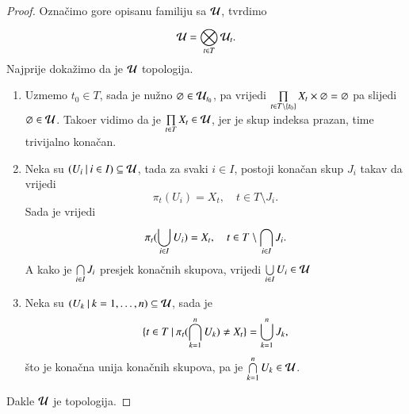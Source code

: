\begin{proof}
    Ozna\v cimo gore opisanu familiju sa $\mathcal{U}$, tvrdimo
    \begin{equation*}
        \mathcal{U} = \bigotimes\limits_{t \in T}^{} \mathcal{U}_t.
    \end{equation*}
    Najprije doka\v zimo da je $\mathcal{U}$ topologija.
    \begin{enumerate}[label=(\roman*)]
        \item Uzmemo $t_0 \in T$, sada je nu\v zno $\varnothing \in \mathcal{U}_{t_0}$, pa vrijedi $\prod\limits_{t \in T \setminus \{t_0\}}^{} X_t \times \varnothing = \varnothing$ pa slijedi $\varnothing \in \mathcal{U}$.
        Tako\dj er vidimo da je $\prod\limits_{t \in T}^{} X_t \in \mathcal{U}$, jer je skup indeksa prazan, time trivijalno kona\v can.
        \item Neka su $({U_i} \: | \: {i \in I}) \subseteq \mathcal{U}$, tada za svaki $i \in I$, postoji kona\v can skup $J_i$ takav da vrijedi
        \begin{equation*}
            \pi_t (U_i) = X_t, \quad t \in T \setminus J_i.
        \end{equation*}
        Sada je vrijedi
        \begin{equation*}
            \pi_t (\bigcup\limits_{i \in I}^{} U_i) = X_t, \quad t \in T \setminus \bigcap\limits_{i \in I}^{} J_i.
        \end{equation*}
        A kako je $\bigcap\limits_{i \in I}^{} J_i$ presjek kona\v cnih skupova, vrijedi $\bigcup\limits_{i \in I}^{} U_i \in \mathcal{U}$
        \item Neka su $({U_k} \: | \: {k = 1, \ldots, n}) \subseteq \mathcal{U}$, sada je
        \begin{equation*}
            \{{t \in T} \: | \: {\pi_t(\bigcap\limits_{k = 1}^{n} U_k) \neq X_t}\} = \bigcup\limits_{k = 1}^{n} J_k,
        \end{equation*}
        \v sto je kona\v cna unija kona\v cnih skupova, pa je $\bigcap\limits_{k = 1}^{n} U_k \in \mathcal{U}$.
    \end{enumerate}
    Dakle $\mathcal{U}$ je topologija.


\end{proof}
